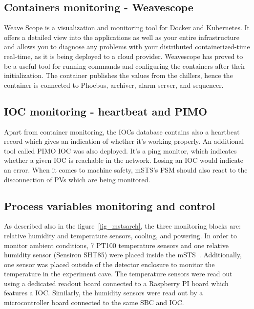 \newpage
\subsection{Containers monitoring - Weavescope}

Weave Scope is a visualization and monitoring tool for Docker and Kubernetes. It offers a detailed view into the applications as well as your entire infrastructure and allows you to diagnose any problems with your distributed containerized-time real-time, as it is being deployed to a cloud provider. Weavescope has proved to be a useful tool for running commands and configuring the containers after their initialization. The container publishes the values from the chillers, hence the container is connected to Phoebus, archiver, alarm-server, and sequencer. 
\subsection{IOC monitoring - heartbeat and PIMO}
Apart from container monitoring, the \glspl{IOC} database contains also a heartbeat record which gives an indication of whether it's working properly. An additional tool called PIMO \gls{IOC} was also deployed. It's a ping monitor, which indicates whether a given \gls{IOC} is reachable in the network. Losing an \gls{IOC} would indicate an error. When it comes to machine safety, \gls{mSTS}'s \gls{FSM} should also react to the disconnection of PVs which are being monitored.
\subsection{Process variables monitoring and control}
As described also in the figure~\ref{fig_mstsarch}, the three monitoring blocks are: relative humidity and temperature sensors, cooling, and powering. In  order to monitor ambient conditions, 7 PT100 temperature sensors and one relative humidity sensor (Sensiron SHT85) were placed inside the \gls{mSTS}~\cite{SHT85}. Additionally, one sensor was placed outside of the detector enclosure to monitor the temperature in the experiment cave. The temperature sensors were read out using a dedicated readout board connected to a Raspberry PI board which features a \gls{IOC}. Similarly, the humidity sensors were read out by a microcontroller board connected to the same \gls{SBC} and \gls{IOC}.

